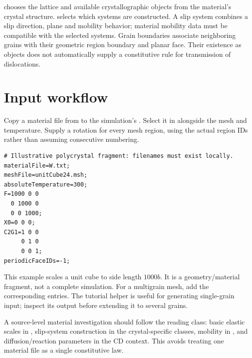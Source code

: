  chooses the lattice and available crystallographic objects from the material's crystal structure.  selects which systems are constructed. A slip system combines a slip direction, plane and mobility behavior; material mobility data must be compatible with the selected systems. Grain boundaries associate neighboring grains with their geometric region boundary and planar face. Their existence as objects does not automatically supply a constitutive rule for transmission of dislocations.

\section{Input workflow}
Copy a material file from  to the simulation's . Select it in  alongside the mesh and temperature. Supply a rotation for every mesh region, using the actual region IDs rather than assuming consecutive numbering.
\par\noindent\begin{minipage}{\linewidth}
\begin{lstlisting}
# Illustrative polycrystal fragment: filenames must exist locally.
materialFile=W.txt;
meshFile=unitCube24.msh;
absoluteTemperature=300;
F=1000 0 0
  0 1000 0
  0 0 1000;
X0=0 0 0;
C2G1=1 0 0
     0 1 0
     0 0 1;
periodicFaceIDs=-1;
\end{lstlisting}
\end{minipage}\par
This example scales a unit cube to side length $1000b$. It is a geometry/material fragment, not a complete simulation. For a multigrain mesh, add the corresponding  entries. The tutorial helper  is useful for generating single-grain input; inspect its output before extending it to several grains.

A source-level material investigation should follow the reading class: basic elastic scales in , slip-system construction in the crystal-specific classes, mobility in , and diffusion/reaction parameters in the CD context. This avoids treating one material file as a single constitutive law.
